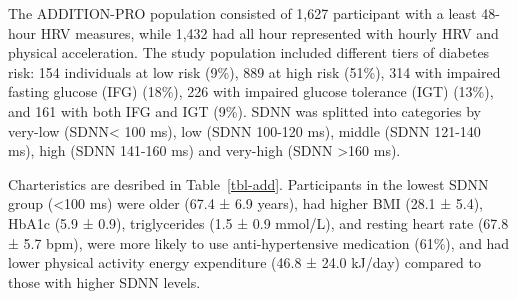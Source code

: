 \documentclass[
  letterpaper,
  headsepline=true,
  open=any]{scrbook}
\begin{document}
The ADDITION-PRO population consisted of 1,627 participant with a least
48-hour HRV measures, while 1,432 had all hour represented with hourly
HRV and physical acceleration. The study population included different
tiers of diabetes risk: 154 individuals at low risk (9\%), 889 at high
risk (51\%), 314 with impaired fasting glucose (IFG) (18\%), 226 with
impaired glucose tolerance (IGT) (13\%), and 161 with both IFG and IGT
(9\%). SDNN was splitted into categories by very-low (SDNN\textless{}
100 ms), low (SDNN 100-120 ms), middle (SDNN 121-140 ms), high (SDNN
141-160 ms) and very-high (SDNN \textgreater160 ms).

Charteristics are desribed in Table~\ref{tbl-add}. Participants in the
lowest SDNN group (\textless100 ms) were older (67.4 ± 6.9 years), had
higher BMI (28.1 ± 5.4), HbA1c (5.9 ± 0.9), triglycerides (1.5 ± 0.9
mmol/L), and resting heart rate (67.8 ± 5.7 bpm), were more likely to
use anti-hypertensive medication (61\%), and had lower physical activity
energy expenditure (46.8 ± 24.0 kJ/day) compared to those with higher
SDNN levels.

\end{document}
